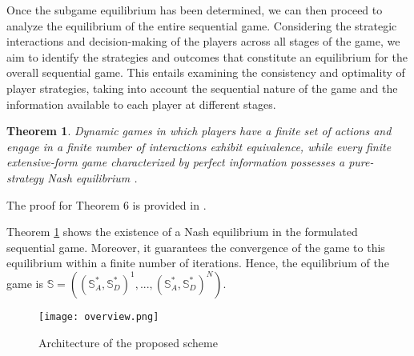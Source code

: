 \documentclass[lettersize,journal]{IEEEtran}
\newtheorem{theorem}{ \textbf{Theorem}}
\begin{document}
Once the subgame equilibrium has been determined, we can then proceed to analyze the equilibrium of the entire sequential game. Considering the strategic interactions and decision-making of the players across all stages of the game, we aim to identify the strategies and outcomes that constitute an equilibrium for the overall sequential game. This entails examining the consistency and optimality of player strategies, taking into account the sequential nature of the game and the information available to each player at different stages.
\begin{theorem}\label{themo_6}
Dynamic games in which players have a finite set of actions and engage in a finite number of interactions exhibit equivalence, while every finite extensive-form game characterized by perfect information possesses a pure-strategy Nash equilibrium \cite{deng2016adaptive}.
\end{theorem}
\begin{IEEEproof}
The proof for Theorem 6 is provided in \cite{kuhn11953extensive}.
\end{IEEEproof}
Theorem \ref{themo_6} shows the existence of a Nash equilibrium in the formulated sequential game. Moreover, it guarantees the convergence of the game to this equilibrium within a finite number of iterations. Hence, the equilibrium of the game is $\mathbb{S}=((\mathbb{S}_{A}^*,\mathbb{S}_{D}^*)^1,...,(\mathbb{S}_{A}^*,\mathbb{S}_{D}^*)^N).$
\begin{figure*}[!t]
\centering
\begin{center}
\texttt{[image: overview.png]}
\caption{Architecture of the proposed scheme}
\label{overview}
\end{center}
\end{figure*}
\end{document}
